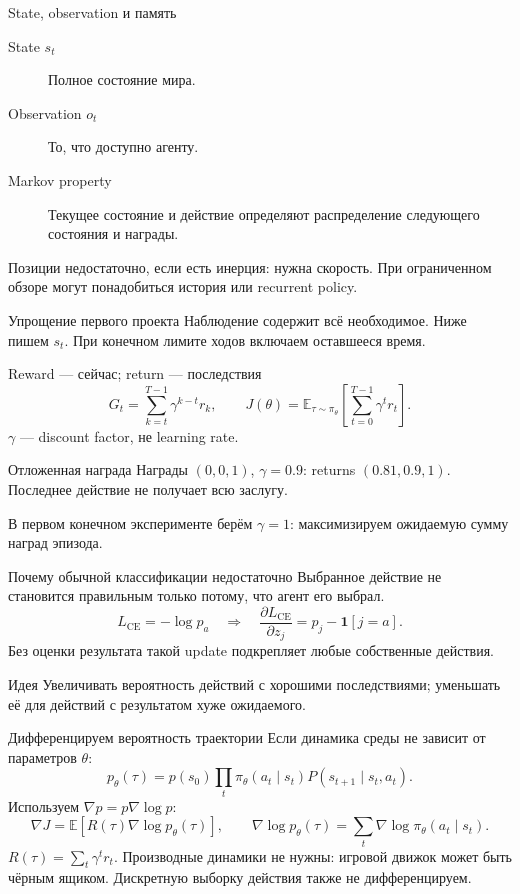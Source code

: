 \documentclass[aspectratio=169]{beamer}
\begin{document}
\begin{frame}{State, observation и память}
  \begin{description}
    \item[State $s_t$] Полное состояние мира.
    \item[Observation $o_t$] То, что доступно агенту.
    \item[Markov property] Текущее состояние и действие определяют
      распределение следующего состояния и награды.
  \end{description}
  Позиции недостаточно, если есть инерция: нужна скорость.
  При ограниченном обзоре могут понадобиться история или recurrent policy.
  \begin{block}{Упрощение первого проекта}
    Наблюдение содержит всё необходимое. Ниже пишем $s_t$.
    При конечном лимите ходов включаем оставшееся время.
  \end{block}
\end{frame}

\begin{frame}{Reward --- сейчас; return --- последствия}
  \[
    G_t=\sum_{k=t}^{T-1}\gamma^{k-t}r_k,
    \qquad J(\theta)=\mathbb E_{\tau\sim\pi_\theta}
    \left[\sum_{t=0}^{T-1}\gamma^t r_t\right].
  \]
  $\gamma$ --- discount factor, не learning rate.
  \begin{exampleblock}{Отложенная награда}
    Награды $(0,0,1)$, $\gamma=0.9$:
    returns $(0.81,0.9,1)$.
    Последнее действие не получает всю заслугу.
  \end{exampleblock}
  В первом конечном эксперименте берём $\gamma=1$:
  максимизируем ожидаемую сумму наград эпизода.
\end{frame}

\begin{frame}{Почему обычной классификации недостаточно}
  Выбранное действие не становится правильным только потому,
  что агент его выбрал.
  \[
    L_{\mathrm{CE}}=-\log p_a
    \quad\Longrightarrow\quad
    \frac{\partial L_{\mathrm{CE}}}{\partial z_j}
    =p_j-\mathbf 1[j=a].
  \]
  Без оценки результата такой update подкрепляет любые собственные действия.
  \begin{block}{Идея}
    Увеличивать вероятность действий с хорошими последствиями;
    уменьшать её для действий с результатом хуже ожидаемого.
  \end{block}
\end{frame}

\begin{frame}{Дифференцируем вероятность траектории}
  \small
  Если динамика среды не зависит от параметров $\theta$:
  \[
    p_\theta(\tau)=p(s_0)\prod_t
    \pi_\theta(a_t\mid s_t)P(s_{t+1}\mid s_t,a_t).
  \]
  Используем $\nabla p=p\nabla\log p$:
  \[
    \nabla J=\mathbb E\left[R(\tau)\nabla\log p_\theta(\tau)\right],
    \qquad
    \nabla\log p_\theta(\tau)=\sum_t\nabla\log\pi_\theta(a_t\mid s_t).
  \]
  $R(\tau)=\sum_t\gamma^t r_t$.
  Производные динамики не нужны: игровой движок может быть чёрным ящиком.
  Дискретную выборку действия также не дифференцируем.
\end{frame}
\end{document}
